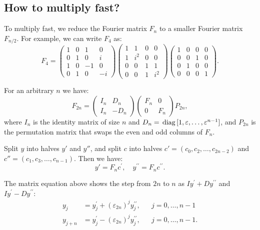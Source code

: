 \subsection{How to multiply fast?}
To multiply fast, we reduce the Fourier matrix $F_n$ to a smaller Fourier matrix $F_{n/2}$. For example, we can write $F_4$ as:
$$
F_4=\begin{pmatrix}
1 & 0 & 1 & 0 \\
0 & 1 & 0 & i \\
1 & 0 & -1 & 0 \\
0 & 1 & 0 & -i
\end{pmatrix}\begin{pmatrix}
1 & 1 & 0 & 0 \\
1 & i^2 & 0 & 0 \\
0 & 0 & 1 & 1 \\
0 & 0 & 1 & i^2
\end{pmatrix}\begin{pmatrix}
1 & 0 & 0 & 0 \\
0 & 0 & 1 & 0 \\
0 & 1 & 0 & 0 \\
0 & 0 & 0 & 1
\end{pmatrix}.$$

For an arbitrary $n$ we have:
$$
F_{2n}=\begin{pmatrix}
I_n & D_n \\
I_n & -D_n
\end{pmatrix}\begin{pmatrix}
F_n & 0 \\
0 & F_n
\end{pmatrix}P_{2n},
$$
where $I_n$ is the identity matrix of size $n$ and $D_n = \,\mathrm{diag}\,[1, \varepsilon, \dots, \varepsilon^{n-1}]$, and $P_{2n}$ is the permutation matrix that swaps the even and odd columns of $F_n$.

Split $y$ into halves $y'$ and $y''$, and split $c$ into halves $c' = (c_0, c_2, \dots, c_{2n-2})$ and $c'' = (c_1, c_3, \dots, c_{n-1})$. Then we have:
$$
y'=F_n c^{\prime}, \quad y^{\prime \prime}=F_n c^{\prime \prime}.
$$

The matrix equation above shows the step from $2n$ to $n$ as $I y^{\prime}+D y^{\prime \prime}$ and $I y^{\prime}-D y^{\prime \prime}$:
$$
\begin{aligned}
y_j & =y_j^{\prime}+\left(\varepsilon_{2n}\right)^j y_j^{\prime \prime}, & & j=0, \ldots, n-1 \\
y_{j+n} & =y_j^{\prime}-\left(\varepsilon_{2n}\right)^j y_j^{\prime \prime}, & & j=0, \ldots, n-1 .
\end{aligned}
$$

